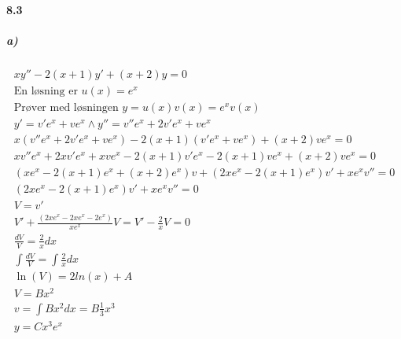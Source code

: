 \documentclass[11pt, A4paper,norsk]{article}
\begin{document}
		\paragraph{8.3}
			\subparagraph{a)}
				\begin{gather*}
xy'' - 2(x + 1)y' + (x + 2)y = 0 \\
\text{En løsning er $u(x) = e^{x}$} \\
\text{Prøver med løsningen $y = u(x)v(x) = e^{x}v(x)$} \\
y' = v'e^{x} + ve^{x} \wedge y'' = v''e^{x} + 2 v'e^{x} + ve^{x} \\
x\left( v''e^{x} + 2 v'e^{x} + ve^{x} \right) - 2(x + 1) \left( v'e^{x} + ve^{x} \right) + (x + 2) v e^{x} = 0 \\
xv''e^{x} + 2xv'e^{x} + xve^{x} - 2(x + 1)v'e^{x} - 2(x + 1)ve^{x} + (x + 2)ve^{x} = 0 \\
(xe^{x} - 2(x + 1)e^{x} + (x + 2)e^{x})v + (2xe^{x} - 2(x + 1)e^{x})v' + xe^{x}v'' = 0 \\
(2xe^{x} - 2(x + 1)e^{x})v' + xe^{x}v'' = 0 \\
V = v' \\
V' + \frac{(2xe^{x} - 2xe^{x} - 2e^{x})}{xe^{x}}V = V' - \frac{2}{x} V = 0 \\
\frac{dV}{V} = \frac{2}{x} dx \\
\int \frac{dV}{V} = \int \frac{2}{x} dx \\
\ln(V) = 2ln(x) + A \\
V = Bx^2 \\
v = \int Bx^2 dx = B \frac{1}{3} x^3 \\
y = C x^3e^{x}
				\end{gather*}
\end{document}
